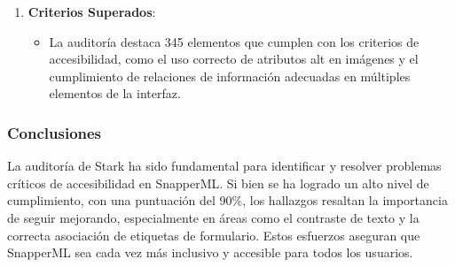\begin{enumerate}
\begin{itemize}
              \item \textbf{Imágenes con fondos complejos}: Se advierte que algunas imágenes de fondo no pueden ser comprobadas automáticamente y se sugiere un análisis manual para garantizar el contraste adecuado.
          \end{itemize}
    \item \textbf{Criterios Superados}:
          \begin{itemize}
              \item La auditoría destaca 345 elementos que cumplen con los criterios de accesibilidad, como el uso correcto de atributos alt en imágenes y el cumplimiento de relaciones de información adecuadas en múltiples elementos de la interfaz.
          \end{itemize}
\end{enumerate}

\subsubsection{Conclusiones}
La auditoría de Stark ha sido fundamental para identificar y resolver problemas críticos de accesibilidad en SnapperML. Si bien se ha logrado un alto nivel de cumplimiento, con una puntuación del 90\%, los hallazgos resaltan la importancia de seguir mejorando, especialmente en áreas como el contraste de texto y la correcta asociación de etiquetas de formulario. Estos esfuerzos aseguran que SnapperML sea cada vez más inclusivo y accesible para todos los usuarios.